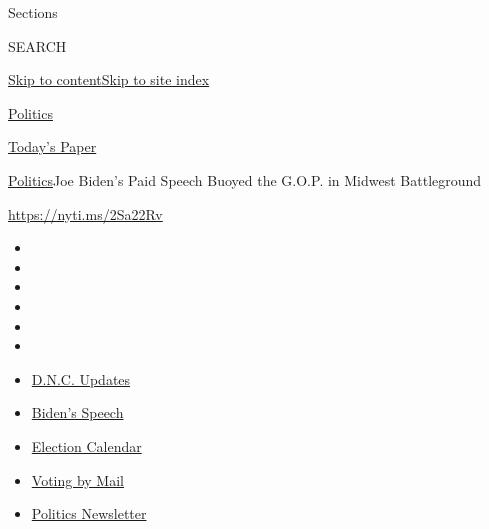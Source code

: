 Sections

SEARCH

\protect\hyperlink{site-content}{Skip to
content}\protect\hyperlink{site-index}{Skip to site index}

\href{https://www.nytimes3xbfgragh.onion/section/politics}{Politics}

\href{https://myaccount.nytimes3xbfgragh.onion/auth/login?response_type=cookie\&client_id=vi}{}

\href{https://www.nytimes3xbfgragh.onion/section/todayspaper}{Today's
Paper}

\href{/section/politics}{Politics}\textbar{}Joe Biden's Paid Speech
Buoyed the G.O.P. in Midwest Battleground

\url{https://nyti.ms/2Sa22Rv}

\begin{itemize}
\item
\item
\item
\item
\item
\item
\end{itemize}

\begin{itemize}
\item
  \href{https://www.nytimes3xbfgragh.onion/live/2020/08/21/us/dnc-convention-election?action=click\&pgtype=Article\&state=default\&region=TOP_BANNER\&context=storylines_menu}{D.N.C.
  Updates}
\item
  \href{https://www.nytimes3xbfgragh.onion/2020/08/20/us/politics/biden-presidential-nomination-dnc.html?action=click\&pgtype=Article\&state=default\&region=TOP_BANNER\&context=storylines_menu}{Biden's
  Speech}
\item
  \href{https://www.nytimes3xbfgragh.onion/interactive/2019/us/elections/2020-presidential-election-calendar.html?action=click\&pgtype=Article\&state=default\&region=TOP_BANNER\&context=storylines_menu}{Election
  Calendar}
\item
  \href{https://www.nytimes3xbfgragh.onion/interactive/2020/08/11/us/politics/vote-by-mail-us-states.html?action=click\&pgtype=Article\&state=default\&region=TOP_BANNER\&context=storylines_menu}{Voting
  by Mail}
\item
  \href{https://www.nytimes3xbfgragh.onion/newsletters/politics?action=click\&pgtype=Article\&state=default\&region=TOP_BANNER\&context=storylines_menu}{Politics
  Newsletter}
\end{itemize}

